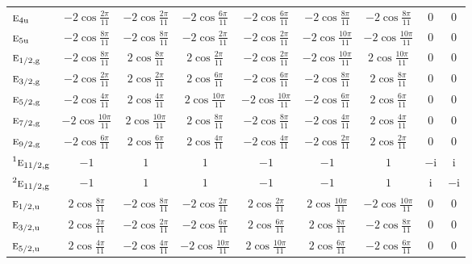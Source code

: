 \documentclass[10pt,a4paper]{article}
\makeatletter
\def\grouprule#1#2{\noalign{\marks\LTgroupmarks{\the\belowrulesep}\nobreak\vskip#1%
  \vskip\aboverulesep}\multispan\LT@cols\unskip{\leaders\hrule\@height#2\hfill\kern\z@}\cr
  \noalign{\penalty\LTrulebreak\vskip\belowrulesep\global\@lastruleclass\z@}}
\numberwithin{equation}{section}
\newcommand{\irr}[1]{\text{\normalfont\scshape #1}}
\newcommand{\conjpair}[1]{{}^{#1}}
\newcommand{\ptag}[1]{\mathrm{#1}}
\newcommand{\iunit}{\mathrm{i}}
\makeatother
\begin{document}
{{\begin{longtable}{@{}lcccccccc@{}}
$\irr{e}_{4\ptag{u}}$ & $-2\cos\tfrac{2\pi}{11}$ & $-2\cos\tfrac{2\pi}{11}$ & $-2\cos\tfrac{6\pi}{11}$ & $-2\cos\tfrac{6\pi}{11}$ & $-2\cos\tfrac{8\pi}{11}$ & $-2\cos\tfrac{8\pi}{11}$ & $0$ & $0$\\
$\irr{e}_{5\ptag{u}}$ & $-2\cos\tfrac{8\pi}{11}$ & $-2\cos\tfrac{8\pi}{11}$ & $-2\cos\tfrac{2\pi}{11}$ & $-2\cos\tfrac{2\pi}{11}$ & $-2\cos\tfrac{10\pi}{11}$ & $-2\cos\tfrac{10\pi}{11}$ & $0$ & $0$\\
\grouprule{0pt}{\lightrulewidth}
$\irr{e}_{1/2,\ptag{g}}$ & $-2\cos\tfrac{8\pi}{11}$ & $2\cos\tfrac{8\pi}{11}$ & $2\cos\tfrac{2\pi}{11}$ & $-2\cos\tfrac{2\pi}{11}$ & $-2\cos\tfrac{10\pi}{11}$ & $2\cos\tfrac{10\pi}{11}$ & $0$ & $0$\\
$\irr{e}_{3/2,\ptag{g}}$ & $-2\cos\tfrac{2\pi}{11}$ & $2\cos\tfrac{2\pi}{11}$ & $2\cos\tfrac{6\pi}{11}$ & $-2\cos\tfrac{6\pi}{11}$ & $-2\cos\tfrac{8\pi}{11}$ & $2\cos\tfrac{8\pi}{11}$ & $0$ & $0$\\
$\irr{e}_{5/2,\ptag{g}}$ & $-2\cos\tfrac{4\pi}{11}$ & $2\cos\tfrac{4\pi}{11}$ & $2\cos\tfrac{10\pi}{11}$ & $-2\cos\tfrac{10\pi}{11}$ & $-2\cos\tfrac{6\pi}{11}$ & $2\cos\tfrac{6\pi}{11}$ & $0$ & $0$\\
$\irr{e}_{7/2,\ptag{g}}$ & $-2\cos\tfrac{10\pi}{11}$ & $2\cos\tfrac{10\pi}{11}$ & $2\cos\tfrac{8\pi}{11}$ & $-2\cos\tfrac{8\pi}{11}$ & $-2\cos\tfrac{4\pi}{11}$ & $2\cos\tfrac{4\pi}{11}$ & $0$ & $0$\\
$\irr{e}_{9/2,\ptag{g}}$ & $-2\cos\tfrac{6\pi}{11}$ & $2\cos\tfrac{6\pi}{11}$ & $2\cos\tfrac{4\pi}{11}$ & $-2\cos\tfrac{4\pi}{11}$ & $-2\cos\tfrac{2\pi}{11}$ & $2\cos\tfrac{2\pi}{11}$ & $0$ & $0$\\
$\conjpair{1}\irr{e}_{11/2,\ptag{g}}$ & $-1$ & $1$ & $1$ & $-1$ & $-1$ & $1$ & $-\iunit{}$ & $\iunit{}$\\
$\conjpair{2}\irr{e}_{11/2,\ptag{g}}$ & $-1$ & $1$ & $1$ & $-1$ & $-1$ & $1$ & $\iunit{}$ & $-\iunit{}$\\
$\irr{e}_{1/2,\ptag{u}}$ & $2\cos\tfrac{8\pi}{11}$ & $-2\cos\tfrac{8\pi}{11}$ & $-2\cos\tfrac{2\pi}{11}$ & $2\cos\tfrac{2\pi}{11}$ & $2\cos\tfrac{10\pi}{11}$ & $-2\cos\tfrac{10\pi}{11}$ & $0$ & $0$\\
$\irr{e}_{3/2,\ptag{u}}$ & $2\cos\tfrac{2\pi}{11}$ & $-2\cos\tfrac{2\pi}{11}$ & $-2\cos\tfrac{6\pi}{11}$ & $2\cos\tfrac{6\pi}{11}$ & $2\cos\tfrac{8\pi}{11}$ & $-2\cos\tfrac{8\pi}{11}$ & $0$ & $0$\\
$\irr{e}_{5/2,\ptag{u}}$ & $2\cos\tfrac{4\pi}{11}$ & $-2\cos\tfrac{4\pi}{11}$ & $-2\cos\tfrac{10\pi}{11}$ & $2\cos\tfrac{10\pi}{11}$ & $2\cos\tfrac{6\pi}{11}$ & $-2\cos\tfrac{6\pi}{11}$ & $0$ & $0$\\

\end{longtable}}}
\end{document}
